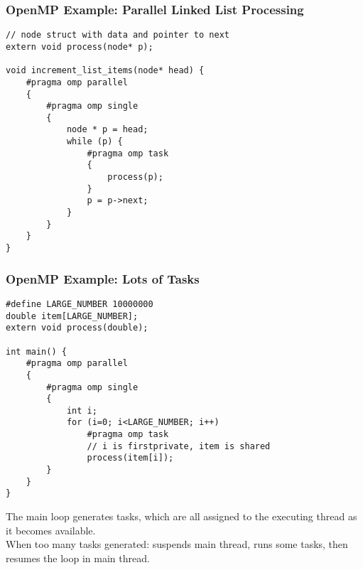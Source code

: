 \documentclass[aspectratio=43]{beamer}
\newenvironment{changemargin}[1]{%
  \begin{list}{}{%
    \setlength{\topsep}{0pt}%
    \setlength{\leftmargin}{#1}%
    \setlength{\rightmargin}{1em}
    \setlength{\listparindent}{\parindent}%
    \setlength{\itemindent}{\parindent}%
    \setlength{\parsep}{\parskip}%
  }%
  \item[]}{\end{list}}
\begin{document}
\begin{frame}[fragile]
  \frametitle{OpenMP Example: Parallel Linked List Processing}

  \begin{changemargin}{1.5cm}
  \begin{lstlisting}
// node struct with data and pointer to next
extern void process(node* p);

void increment_list_items(node* head) {
    #pragma omp parallel
    {
        #pragma omp single
        {
            node * p = head;
            while (p) {
                #pragma omp task
                {
                    process(p);
                }
                p = p->next;
            }
        }
    }
}
  \end{lstlisting}
  \end{changemargin}
\end{frame}


\begin{frame}[fragile]
  \frametitle{OpenMP Example: Lots of Tasks}

  \begin{changemargin}{1.5cm}
  \begin{lstlisting}
#define LARGE_NUMBER 10000000
double item[LARGE_NUMBER];
extern void process(double);

int main() {
    #pragma omp parallel
    {
        #pragma omp single
        {
            int i;
            for (i=0; i<LARGE_NUMBER; i++)
                #pragma omp task
                // i is firstprivate, item is shared
                process(item[i]);
        }
    }
}
  \end{lstlisting}


  The main loop generates tasks, which are all assigned to the executing thread as it becomes available.\\[1em]
  When too many tasks generated: suspends main thread, runs some tasks, then resumes the loop in main thread.
  \end{changemargin}
\end{frame}
\end{document}
